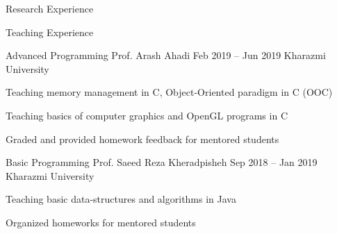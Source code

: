 \documentclass[]{main}
\begin{document}

\begin{section}{Research Experience}
    \begin{subsection}{  }{  }{  }{  }
            \item  \;\href{  }{\faExternalLink*}
            \end{subsection}
    \end{section}

\begin{section}{Teaching Experience}
    \begin{subsection}{ Advanced Programming }{ Prof. Arash Ahadi }{ Feb 2019 -- Jun 2019 }{ Kharazmi University }
            \item Teaching memory management in C, Object-Oriented paradigm in C (OOC) \;\href{ https://github.com/ckoliber/ooc_lecture }{\faExternalLink*}
            \item Teaching basics of computer graphics and OpenGL programs in C \;\href{ https://github.com/ckoliber/opengl }{\faExternalLink*}
            \item Graded and provided homework feedback for mentored students 
            \end{subsection}
    \begin{subsection}{ Basic Programming }{ Prof. Saeed Reza Kheradpisheh }{ Sep 2018 -- Jan 2019 }{ Kharazmi University }
            \item Teaching basic data-structures and algorithms in Java 
            \item Organized homeworks for mentored students \;\href{ https://github.com/ckoliber/Phy97Sources }{\faExternalLink*}
            \end{subsection}
    \end{section}
\end{document}
